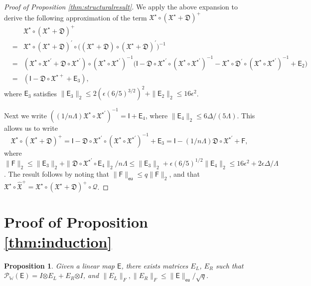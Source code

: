 \documentclass[11pt,letterpaper]{article}
\newtheorem{proposition}[theorem]{Proposition}
\newcommand{\botimes}{\boldsymbol \otimes}
\newcommand{\cp}{\mathcal{P}}
\newcommand{\xx}{\mathfrak{X}}
\newcommand{\dd}{\mathfrak{D}}
\newcommand{\sfe}{\mathsf{E}}
\newcommand{\sff}{\mathsf{F}}
\newcommand{\sfi}{\mathsf{I}}
\newcommand{\eu}{\mathsf{eu}}
\newcommand{\coveig}{\Lambda}
\newcommand{\covsup}{\Delta}
\begin{document}
\begin{proof} [Proof of Proposition \ref{thm:structuralresult}]
	We apply the above expansion to derive the following approximation of the term $\xx^{\star} \circ (\xx^{\star} + \dd)^{+}$
	\begin{eqnarray*}
		& & \xx^{\star}\circ(\xx^{\star} + \dd)^{+} \\
		&=& \xx^{\star} \circ (\xx^{\star} + \dd)^{\prime} \circ \bigl((\xx^{\star} + \dd)\circ(\xx^{\star} + \dd)^{\prime} \bigr)^{-1} \\
		&=& (\xx^{\star}\circ\xx^{\star\prime} + \dd\circ \xx^{\star\prime} )\circ(\xx^{\star}\circ \xx^{\star\prime})^{-1} \bigl( \sfi - \dd \circ \xx^{\star\prime} \circ (\xx^{\star} \circ \xx^{\star\prime})^{-1} - \xx^{\star} \circ \dd^{\prime}\circ(\xx^{\star} \circ \xx^{\star\prime})^{-1} + \sfe_2 \bigr) \\
		&=& (\sfi - \dd \circ \xx^{\star+} + \sfe_3 ),
	\end{eqnarray*}
	where $\sfe_3$ satisfies $\| \sfe_3\|_{2} \leq 2(\epsilon (6/5)^{3/2})^2 + \| \sfe_2 \|_{2} \leq 16\epsilon^2$. 
	
	Next we write $((1/n\coveig)\xx^{\star} \circ \xx^{\star\prime})^{-1} = \sfi + \sfe_4$, where $\|\sfe_4\|_{2} \leq 6\covsup / (5\coveig)$. This allows us to write
	\begin{equation*}
		\xx^{\star} \circ (\xx^{\star} + \dd)^{+} = \sfi - \dd \circ \xx^{\star\prime} \circ (\xx^{\star} \circ \xx^{\star\prime})^{-1} + \sfe_3 =\sfi - (1/n\coveig) \dd \circ \xx^{\star \prime} + \sff,
	\end{equation*}
	where $\|\sff\|_{2} \leq  \| \sfe_3 \|_{2} + \| \dd \circ \xx^{\star\prime} \circ \sfe_4 \|_{2} /n\coveig \leq \| \sfe_3 \|_{2} + \epsilon (6/5)^{1/2} \| \sfe_4 \|_{2} \leq 16 \epsilon^2 + 2 \epsilon \covsup/\coveig$.  The result follows by noting that $\|\sff\|_{\eu} \leq q \|\sff\|_{2}$, and that $\xx^{\star} \circ \hat{\xx}^{+} = \xx^{\star} \circ (\xx^{\star} + \dd)^{+} \circ \mathcal{Q}$.
\end{proof}


\section{Proof of Proposition \ref{thm:induction}} \label{apx:linearizemanifold}

\begin{proposition}\label{thm:projectorwbound}
	Given a linear map $\sfe$, there exists matrices $E_L$, $E_R$ such that
	$\cp_{\mathbb{W}} (\sfe) = I \botimes E_L + E_R \botimes I$, and $\|E_L\|_F,\|E_R\|_F \leq \|\sfe\|_{\eu}/\sqrt{q}$.
\end{proposition}
\end{document}
